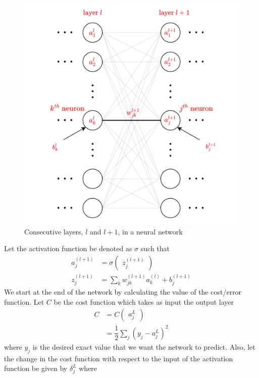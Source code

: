\begin{figure}[ht]
  \centering
  \includegraphics[scale=1.05]{CHAPTER_2/c2_bb_nn_cons_draw.png}
  \caption{Consecutive layers, $l$ and $l+1$, in a neural network}
  \label{fig:bp_nn_complete_cons_layer}
\end{figure}
Let the activation function be denoted as $\sigma$ such that
\begin{align}
  \label{eq:activation_function_at_l+1 layer}
  a_j^{(l+1)} &= \sigma\begin{pmatrix}
    z_j^{(l+1)}
  \end{pmatrix} \\
  \label{eq:input of activation_function_at_l+1 layer}
  z_j^{(l+1)} &= \sum_kw_{jk}^{(l+1)}a_k^{(l)} + b_j^{(l+1)}
\end{align}
We start at the end of the network by calculating the value of the cost/error function. Let $C$ be the cost function which takes as input the output layer
\begin{align}
  \label{eq:cost_function_definition}
  C &= C\begin{pmatrix}
    a_j^L
  \end{pmatrix} \\
    &=\dfrac{1}{2} \sum_j (y_j - a_j^{L})^2  
    \nonumber
\end{align}
where $y_j$ is the desired exact value that we want the network to predict. Also, let the change in the cost function with respect to the input of the activation function be given by $\delta_j^L$ where 
